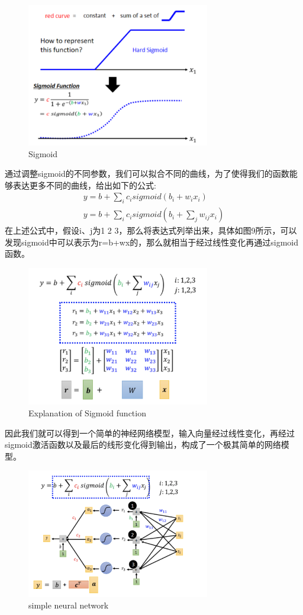 \documentclass{article}
\begin{document}
\begin{figure}[H]
    \centering
    \includegraphics[width=8cm]{picture/Sigmoid.png}
    \caption{Sigmoid}
    \label{fig:galxy}
\end{figure}
\indent 通过调整sigmoid的不同参数，我们可以拟合不同的曲线，为了使得我们的函数能够表达更多不同的曲线，给出如下的公式:
\begin{gather*}
    y = b + \sum_{i} c_{i} sigmoid ( b_{i} + w_{i} x_{i})  \\
    y = b + \sum_{i} c_{i} sigmoid \left( b_{i} + \sum_{j} w_{ij} x_{i} \right)
\end{gather*}
\indent 在上述公式中，假设i、j为1 2 3，那么将表达式列举出来，具体如图9所示，可以发现sigmoid中可以表示为r=b+wx的，那么就相当于经过线性变化再通过sigmoid函数。
\begin{figure}[H]
    \centering
    \includegraphics[width=8cm]{picture/EepofSig.png}
    \caption{Explanation of Sigmoid function}
    \label{fig:galxy}
\end{figure}
\indent 因此我们就可以得到一个简单的神经网络模型，输入向量经过线性变化，再经过sigmoid激活函数以及最后的线形变化得到输出，构成了一个极其简单的网络模型。
\begin{figure}[H]
    \centering
    \includegraphics[width=8cm]{picture/LtoNN.png}
    \caption{simple neural network}
    \label{fig:galxy}
\end{figure}
\end{document}
